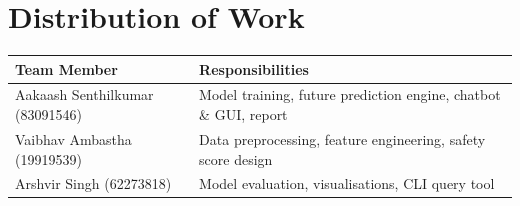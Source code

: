 \documentclass{article}
\begin{document}
\section*{Distribution of Work}

\begin{table}[H]
  \centering
  \begin{tabular}{ll}
    \toprule
    \textbf{Team Member} & \textbf{Responsibilities} \\
    \midrule
    Aakaash Senthilkumar (83091546) &
      Model training, future prediction engine, chatbot \& GUI, report \\
    Vaibhav Ambastha (19919539) &
      Data preprocessing, feature engineering, safety score design \\
    Arshvir Singh (62273818) &
      Model evaluation, visualisations, CLI query tool \\
    \bottomrule
  \end{tabular}
\end{table}



\end{document}
